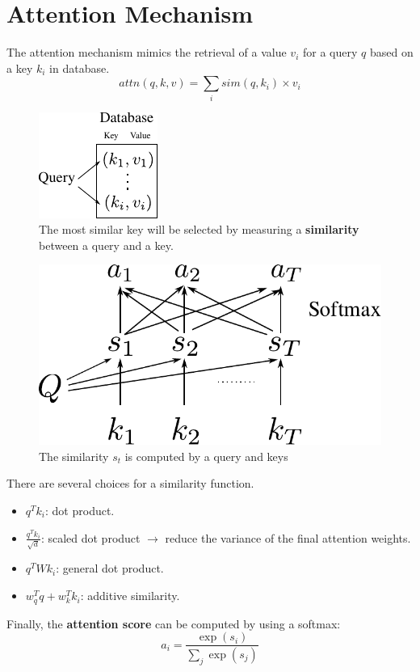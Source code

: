 \section{Attention Mechanism}
\label{sec:nlp_attention}
The attention mechanism mimics the retrieval of a value $v_i$ for a query $q$ based on a key $k_i$ in database.
$$attn(q, k, v) = \sum_i sim(q,k_i)\times v_i$$
\begin{figure}[h]
	\centering
	\includegraphics[scale=1.8]{./images/transformer/attention_database.pdf}
	\caption{The most similar key will be selected by measuring a \textbf{similarity} between a query and a key.}
\end{figure}

\begin{figure}[h]
	\centering
	\includegraphics[scale=0.6]{./images/transformer/attention.pdf}
	\caption{The similarity $s_t$ is computed by a query and keys}
\end{figure}
There are several choices for a similarity function.
\begin{itemize}
	\item $q^Tk_i$: dot product.
	\item $\frac{q^Tk_i}{\sqrt{d}}$: scaled dot product $\to$ reduce the variance of the final attention weights. 
	\item $q^TWk_i$: general dot product.
	\item $w_q^Tq+ w_k^Tk_i$: additive similarity.
\end{itemize}
Finally, the \textbf{attention score} can be computed by using a softmax:
$$a_i = \frac{\exp(s_i)}{\sum_j \exp(s_j)}$$



